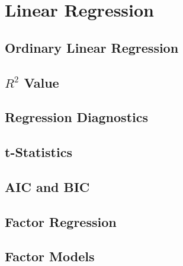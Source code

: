 \chapter{Linear Regression}

\section{Ordinary Linear Regression}

\section{$R^2$ Value}

\section{Regression Diagnostics}

\section{t-Statistics}

\section{AIC and BIC}

\section{Factor Regression}

\section{Factor Models}


\chapauthor{}

